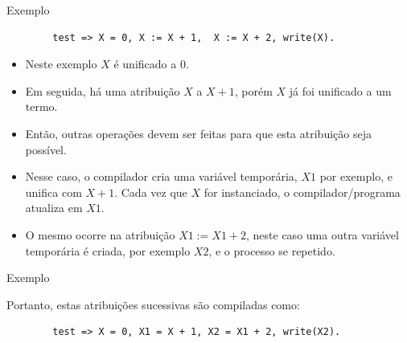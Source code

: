 \begin{frame}[fragile]
	
	\begin{block}{Exemplo}

		\begin{verbatim}
		test => X = 0, X := X + 1,  X := X + 2, write(X).
		\end{verbatim}
		\begin{itemize}
		  \item Neste exemplo $X$ é unificado a $0$. 
		  
		  \item Em seguida, há uma atribuição $X$ a $X+1$, porém $X$ já foi unificado a um termo. 
		  
		  \item Então, outras operações devem ser feitas para que esta atribuição seja
		possível.
		
   \item	Nesse caso, o compilador  cria uma variável temporária, $X1$ por exemplo, e unifica com
		$X+1$. Cada vez que $X$ for instanciado, o compilador/programa atualiza em $X1$.
		
		\item	 O mesmo ocorre na atribuição $X1 := X1 + 2$, neste caso uma outra variável temporária é criada,  por exemplo	$X2$, e o processo se repetido.
	  
		\end{itemize}
			
	\end{block}
	
\end{frame}
	
	
	
\begin{frame}[fragile]
	
	\begin{block}{Exemplo}

	
		Portanto, estas atribuições sucessivas são compiladas como:
		\pause
		\begin{verbatim}
		test => X = 0, X1 = X + 1, X2 = X1 + 2, write(X2).
		\end{verbatim} 
		
	\end{block}
	
\end{frame}




